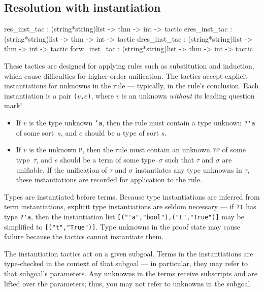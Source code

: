 \subsection{Resolution with instantiation} \label{res_inst_tac}
\begin{ttbox} 
res_inst_tac  : (string*string)list -> thm -> int -> tactic
eres_inst_tac : (string*string)list -> thm -> int -> tactic
dres_inst_tac : (string*string)list -> thm -> int -> tactic
forw_inst_tac : (string*string)list -> thm -> int -> tactic
\end{ttbox}
These tactics are designed for applying rules such as substitution and
induction, which cause difficulties for higher-order unification.  The
tactics accept explicit instantiations for unknowns in the rule ---
typically, in the rule's conclusion.  Each instantiation is a pair
{\tt($v$,$e$)}, where $v$ is an unknown \emph{without} its leading
question mark!
\begin{itemize}
\item If $v$ is the type unknown {\tt'a}, then
the rule must contain a type unknown \verb$?'a$ of some
sort~$s$, and $e$ should be a type of sort $s$.

\item If $v$ is the unknown {\tt P}, then
the rule must contain an unknown \verb$?P$ of some type~$\tau$,
and $e$ should be a term of some type~$\sigma$ such that $\tau$ and
$\sigma$ are unifiable.  If the unification of $\tau$ and $\sigma$
instantiates any type unknowns in $\tau$, these instantiations
are recorded for application to the rule.
\end{itemize}
Types are instantiated before terms.  Because type instantiations are
inferred from term instantiations, explicit type instantiations are seldom
necessary --- if \verb$?t$ has type \verb$?'a$, then the instantiation list
\verb$[("'a","bool"),("t","True")]$ may be simplified to
\verb$[("t","True")]$.  Type unknowns in the proof state may cause
failure because the tactics cannot instantiate them.

The instantiation tactics act on a given subgoal.  Terms in the
instantiations are type-checked in the context of that subgoal --- in
particular, they may refer to that subgoal's parameters.  Any unknowns in
the terms receive subscripts and are lifted over the parameters; thus, you
may not refer to unknowns in the subgoal.

